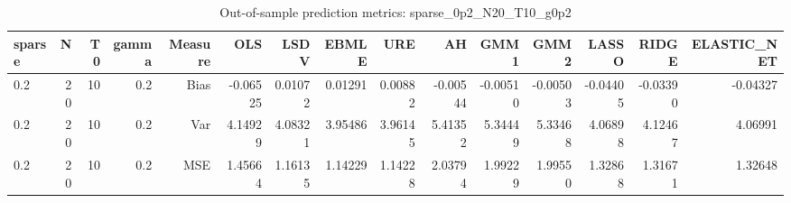 \begin{table}[!htbp]\centering
\caption{Out-of-sample prediction metrics: sparse_0p2_N20_T10_g0p2}
\label{tab:table3_sparse_0p2_N20_T10_g0p2}
\begin{tabular}{lrrrrrrrrrrrrrr}
\hline
sparse & N & T0 & gamma & Measure & OLS & LSDV & EBMLE & URE & AH & GMM1 & GMM2 & LASSO & RIDGE & ELASTIC_NET \\
\hline
0.2 & 20 & 10 & 0.2 & Bias & -0.06525 & 0.01072 & 0.01291 & 0.00882 & -0.00544 & -0.00510 & -0.00503 & -0.04405 & -0.03390 & -0.04327 \\
0.2 & 20 & 10 & 0.2 & Var & 4.14929 & 4.08321 & 3.95486 & 3.96145 & 5.41352 & 5.34449 & 5.33468 & 4.06898 & 4.12467 & 4.06991 \\
0.2 & 20 & 10 & 0.2 & MSE & 1.45664 & 1.16135 & 1.14229 & 1.14228 & 2.03794 & 1.99229 & 1.99550 & 1.32868 & 1.31671 & 1.32648 \\
\hline
\end{tabular}
\end{table}

